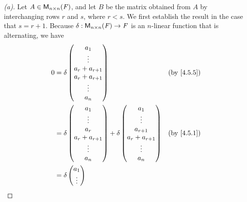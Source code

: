 \begin{proof}[(a)]
  Let \(A \in \ms[n][n][\F]\), and let \(B\) be the matrix obtained from \(A\) by interchanging rows \(r\) and \(s\), where \(r < s\).
  We first establish the result in the case that \(s = r + 1\).
  Because \(\delta : \ms[n][n][\F] \to \F\) is an \(n\)-linear function that is alternating, we have
  \begin{align*}
    0 & = \delta\begin{pmatrix}
                  a_1             \\
                  \vdots          \\
                  a_r + a_{r + 1} \\
                  a_r + a_{r + 1} \\
                  \vdots          \\
                  a_n
                \end{pmatrix}               &  & \by{4.5.5}                                                     \\
      & = \delta\begin{pmatrix}
                  a_1             \\
                  \vdots          \\
                  a_r             \\
                  a_r + a_{r + 1} \\
                  \vdots          \\
                  a_n
                \end{pmatrix} + \delta\begin{pmatrix}
                                        a_1             \\
                                        \vdots          \\
                                        a_{r + 1}       \\
                                        a_r + a_{r + 1} \\
                                        \vdots          \\
                                        a_n
                                      \end{pmatrix} &  & \by{4.5.1}                                             \\
      & = \delta\begin{pmatrix}
                  a_1    \\
                  \vdots \\

\end{pmatrix}
\end{align*}
\end{proof}
